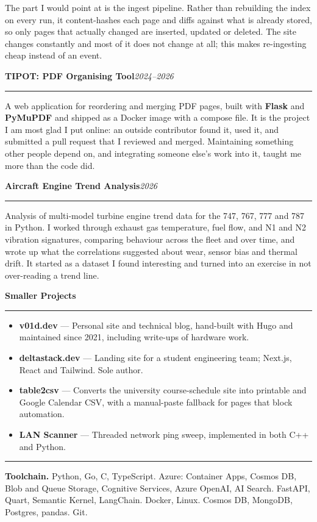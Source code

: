 \documentclass[11pt,a4paper]{article}
\newcommand{\entry}[2]{%
  \vspace{6pt}%
  {\Large\bfseries #1}\hfill{\itshape\small #2}\par
  \vspace{3pt}\hrule\vspace{4pt}%
}
\begin{document}
The part I would point at is the ingest pipeline. Rather than rebuilding the
index on every run, it content-hashes each page and diffs against what is
already stored, so only pages that actually changed are inserted, updated or
deleted. The site changes constantly and most of it does not change at all; this
makes re-ingesting cheap instead of an event.

\entry{TIPOT: PDF Organising Tool}{2024--2026}

A web application for reordering and merging PDF pages, built with
\textbf{Flask} and \textbf{PyMuPDF} and shipped as a Docker image with a
compose file. It is the project I am most glad I put online: an outside
contributor found it, used it, and submitted a pull request that I reviewed and
merged. Maintaining something other people depend on, and integrating someone
else's work into it, taught me more than the code did.

\entry{Aircraft Engine Trend Analysis}{2026}

Analysis of multi-model turbine engine trend data for the 747, 767, 777 and 787
in Python. I worked through exhaust gas temperature, fuel flow, and N1 and N2
vibration signatures, comparing behaviour across the fleet and over time, and
wrote up what the correlations suggested about wear, sensor bias and thermal
drift. It started as a dataset I found interesting and turned into an exercise
in not over-reading a trend line.

\entry{Smaller Projects}{}

\begin{itemize}
    \item \textbf{v01d.dev} --- Personal site and technical blog, hand-built with Hugo and maintained since 2021, including write-ups of hardware work.
    \item \textbf{deltastack.dev} --- Landing site for a student engineering team; Next.js, React and Tailwind. Sole author.
    \item \textbf{table2csv} --- Converts the university course-schedule site into printable and Google Calendar CSV, with a manual-paste fallback for pages that block automation.
    \item \textbf{LAN Scanner} --- Threaded network ping sweep, implemented in both C++ and Python.
\end{itemize}

\vspace{8pt}
\hrule
\vspace{6pt}

\textbf{Toolchain.} Python, Go, C, TypeScript. Azure: Container Apps, Cosmos DB,
Blob and Queue Storage, Cognitive Services, Azure OpenAI, AI Search. FastAPI,
Quart, Semantic Kernel, LangChain. Docker, Linux. Cosmos DB, MongoDB, Postgres,
pandas. Git.
\end{document}
